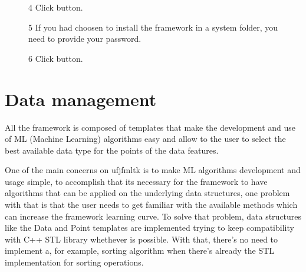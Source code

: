 \documentclass[letterpaper,10pt,english]{sphinxmanual}
\let\sphinxpxdimen\pdfpxdimen\else\newdimen\sphinxpxdimen
\begin{document}
\begin{figure}[htbp]
\centering
\capstart

\noindent\sphinxincludegraphics[width=450\sphinxpxdimen]{{l4}.png}
\caption{4 \sphinxhyphen{} Click  button.}\label{\detokenize{getting_started/installation:id11}}\end{figure}

\begin{figure}[htbp]
\centering
\capstart

\noindent\sphinxincludegraphics[width=450\sphinxpxdimen]{{l5}.png}
\caption{5 \sphinxhyphen{} If you had choosen to install the framework in a system folder, you need to provide your  password.}\label{\detokenize{getting_started/installation:id12}}\end{figure}

\begin{figure}[htbp]
\centering
\capstart

\noindent\sphinxincludegraphics[width=450\sphinxpxdimen]{{l6}.png}
\caption{6 \sphinxhyphen{} Click  button.}\label{\detokenize{getting_started/installation:id13}}\end{figure}


\chapter{Data management}
\label{\detokenize{getting_started/datamanagement:data-management}}\label{\detokenize{getting_started/datamanagement::doc}}
\sphinxAtStartPar
All the framework is composed of templates that make the development and use of ML (Machine Learning) algorithms easy and allow to the user to select the best available data type for the points of the data features.

\sphinxAtStartPar
One of the main concerns on ufjfmltk is to make ML algorithms development and usage simple, to accomplish that its necessary for the framework to have algorithms that can be applied on the underlying data structures,
one problem with that is that the user needs to get familiar with the available methods which can increase the framework learning curve. To solve that problem, data structures like the Data and Point templates are implemented
trying to keep compatibility with C++ STL library whethever is possible. With that, there’s no need to implement a, for example, sorting algorithm when there’s already the STL implementation for sorting operations.
\end{document}
